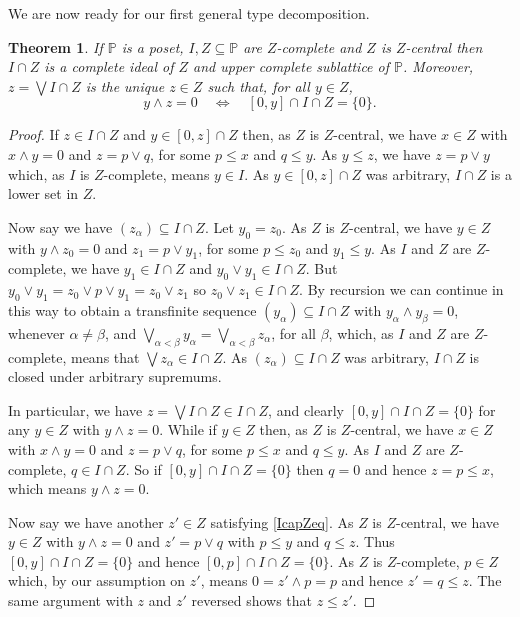 \documentclass{amsart}
\newtheorem{thm}{Theorem}[section]
\theoremstyle{definition}
\numberwithin{equation}{section}
\begin{document}
We are now ready for our first general type decomposition.

\begin{thm}\label{IcapZ}
If $\mathbb{P}$ is a poset, $I,Z\subseteq\mathbb{P}$ are $Z$-complete and $Z$ is $Z$-central then $I\cap Z$ is a complete ideal of $Z$ and upper complete sublattice of $\mathbb{P}$.  Moreover, $z=\bigvee I\cap Z$ is the unique $z\in Z$ such that, for all $y\in Z$,
\begin{equation}\label{IcapZeq}
y\wedge z=0\quad\Leftrightarrow\quad[0,y]\cap I\cap Z=\{0\}.
\end{equation}
\end{thm}

\begin{proof}
If $z\in I\cap Z$ and $y\in[0,z]\cap Z$ then, as $Z$ is $Z$-central, we have $x\in Z$ with $x\wedge y=0$ and $z=p\vee q$, for some $p\leq x$ and $q\leq y$.  As $y\leq z$, we have $z=p\vee y$ which, as $I$ is $Z$-complete, means $y\in I$.  As $y\in[0,z]\cap Z$ was arbitrary, $I\cap Z$ is a lower set in $Z$.

Now say we have $(z_\alpha)\subseteq I\cap Z$.  Let $y_0=z_0$.  As $Z$ is $Z$-central, we have $y\in Z$ with $y\wedge z_{0}=0$ and $z_1=p\vee y_1$, for some $p\leq z_0$ and $y_1\leq y$.  As $I$ and $Z$ are $Z$-complete, we have $y_1\in I\cap Z$ and $y_0\vee y_1\in I\cap Z$.  But $y_0\vee y_1=z_0\vee p\vee y_1=z_0\vee z_1$ so $z_0\vee z_1\in I\cap Z$.  By recursion we can continue in this way to obtain a transfinite sequence $(y_\alpha)\subseteq I\cap Z$ with $y_\alpha\wedge y_\beta=0$, whenever $\alpha\neq\beta$, and $\bigvee_{\alpha<\beta}y_\alpha=\bigvee_{\alpha<\beta}z_\alpha$, for all $\beta$, which, as $I$ and $Z$ are $Z$-complete, means that $\bigvee z_\alpha\in I\cap Z$.  As $(z_\alpha)\subseteq I\cap Z$ was arbitrary, $I\cap Z$ is closed under arbitrary supremums.

In particular, we have $z=\bigvee I\cap Z\in I\cap Z$, and clearly $[0,y]\cap I\cap Z=\{0\}$ for any $y\in Z$ with $y\wedge z=0$.  While if $y\in Z$ then, as $Z$ is $Z$-central, we have $x\in Z$ with $x\wedge y=0$ and $z=p\vee q$, for some $p\leq x$ and $q\leq y$.  As $I$ and $Z$ are $Z$-complete, $q\in I\cap Z$.  So if $[0,y]\cap I\cap Z=\{0\}$ then $q=0$ and hence $z=p\leq x$, which means $y\wedge z=0$.

Now say we have another $z'\in Z$ satisfying \eqref{IcapZeq}.  As $Z$ is $Z$-central, we have $y\in Z$ with $y\wedge z=0$ and $z'=p\vee q$ with $p\leq y$ and $q\leq z$.  Thus $[0,y]\cap I\cap Z=\{0\}$ and hence $[0,p]\cap I\cap Z=\{0\}$.  As $Z$ is $Z$-complete, $p\in Z$ which, by our assumption on $z'$, means $0=z'\wedge p=p$ and hence $z'=q\leq z$.  The same argument with $z$ and $z'$ reversed shows that $z\leq z'$.
\end{proof}
\end{document}
